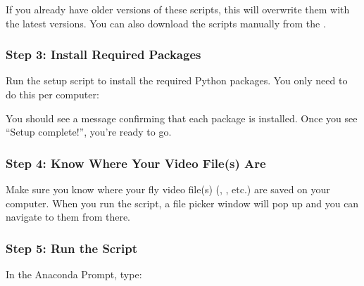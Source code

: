 \documentclass[letterpaper,10pt,english]{jupyterBook}
\begin{document}
\sphinxAtStartPar
If you already have older versions of these scripts, this will overwrite them with the latest versions. You can also download the scripts manually from the .


\subsubsection{Step 3: Install Required Packages}
\label{\detokenize{FlyTracking/Script:step-3-install-required-packages}}
\sphinxAtStartPar
Run the setup script to install the required Python packages. You only need to do this  per computer:

\begin{sphinxVerbatim}[commandchars=\\\{\}]
 
\end{sphinxVerbatim}

\sphinxAtStartPar
You should see a message confirming that each package is installed. Once you see “Setup complete!”, you’re ready to go.


\subsubsection{Step 4: Know Where Your Video File(s) Are}
\label{\detokenize{FlyTracking/Script:step-4-know-where-your-video-file-s-are}}
\sphinxAtStartPar
Make sure you know where your fly video file(s) (, , etc.) are saved on your computer. When you run the script, a file picker window will pop up and you can navigate to them from there.


\subsubsection{Step 5: Run the Script}
\label{\detokenize{FlyTracking/Script:step-5-run-the-script}}
\sphinxAtStartPar
In the Anaconda Prompt, type:

\begin{sphinxVerbatim}[commandchars=\\\{\}]
 
\end{sphinxVerbatim}
\end{document}

